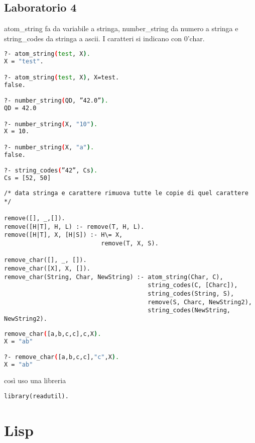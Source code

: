 \documentclass[a4paper,12pt, oneside]{book}
\begin{document}
\section{Laboratorio 4}
atom\_string fa da variabile a stringa, number\_string da numero a stringa e string\_codes da stringa a ascii. I caratteri si indicano con 0'char.
\begin{shaded}
\begin{lstlisting}[language=bash]
?- atom_string(test, X).
X = "test".

?- atom_string(test, X), X=test.
false.

?- number_string(QD, ”42.0”).
QD = 42.0

?- number_string(X, "10").
X = 10.

?- number_string(X, "a").
false.

?- string_codes(”42”, Cs).
Cs = [52, 50]
\end{lstlisting}
\end{shaded}
\begin{esercizio}
\begin{verbatim}
/* data stringa e carattere rimuova tutte le copie di quel carattere */

remove([], _,[]).
remove([H|T], H, L) :- remove(T, H, L).
remove([H|T], X, [H|S]) :- H\= X,
                           remove(T, X, S).

remove_char([], _, []).
remove_char([X], X, []).
remove_char(String, Char, NewString) :- atom_string(Char, C),
                                        string_codes(C, [Charc]),
                                        string_codes(String, S),
                                        remove(S, Charc, NewString2),
                                        string_codes(NewString, NewString2).
\end{verbatim}
\begin{shaded}
\begin{lstlisting}[language=bash]
remove_char([a,b,c,c],c,X).
X = "ab"

?- remove_char([a,b,c,c],"c",X).
X = "ab" 
\end{lstlisting}
\end{shaded}
\end{esercizio}
così uso una libreria
\begin{verbatim}
library(readutil).
\end{verbatim}
\chapter{Lisp}
\end{document}
